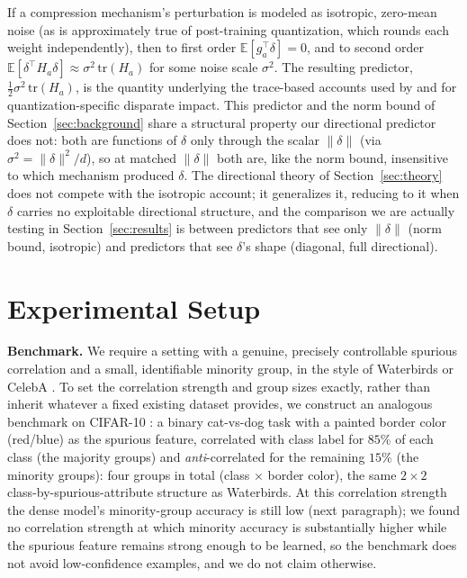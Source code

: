\documentclass{article}
\begin{document}
If a compression mechanism's perturbation is modeled as isotropic, zero-mean noise (as is approximately true of post-training quantization, which rounds each weight independently), then to first order $\mathbb{E}[g_a^\top \delta] = 0$, and to second order $\mathbb{E}[\delta^\top H_a \delta] \approx \sigma^2 \,\mathrm{tr}(H_a)$ for some noise scale $\sigma^2$. The resulting predictor, $\tfrac12\sigma^2\,\mathrm{tr}(H_a)$, is the quantity underlying the trace-based accounts used by \citet{liu2025understanding} and \citet{bellam2024causes,bellam2025explaining} for quantization-specific disparate impact. This predictor and the norm bound of Section~\ref{sec:background} share a structural property our directional predictor does not: both are functions of $\delta$ only through the scalar $\|\delta\|$ (via $\sigma^2 = \|\delta\|^2/d$), so at matched $\|\delta\|$ both are, like the norm bound, insensitive to which mechanism produced $\delta$. The directional theory of Section~\ref{sec:theory} does not compete with the isotropic account; it generalizes it, reducing to it when $\delta$ carries no exploitable directional structure, and the comparison we are actually testing in Section~\ref{sec:results} is between predictors that see only $\|\delta\|$ (norm bound, isotropic) and predictors that see $\delta$'s shape (diagonal, full directional).

\section{Experimental Setup}
\label{sec:setup}

\textbf{Benchmark.} We require a setting with a genuine, precisely controllable spurious correlation and a small, identifiable minority group, in the style of Waterbirds \citep{sagawa2020group} or CelebA \citep{liu2015celeba}. To set the correlation strength and group sizes exactly, rather than inherit whatever a fixed existing dataset provides, we construct an analogous benchmark on CIFAR-10 \citep{krizhevsky2009cifar}: a binary cat-vs-dog task with a painted border color (red/blue) as the spurious feature, correlated with class label for $85\%$ of each class (the majority groups) and \emph{anti}-correlated for the remaining $15\%$ (the minority groups): four groups in total (class $\times$ border color), the same $2\times2$ class-by-spurious-attribute structure as Waterbirds. At this correlation strength the dense model's minority-group accuracy is still low (next paragraph); we found no correlation strength at which minority accuracy is substantially higher while the spurious feature remains strong enough to be learned, so the benchmark does not avoid low-confidence examples, and we do not claim otherwise.
\end{document}
